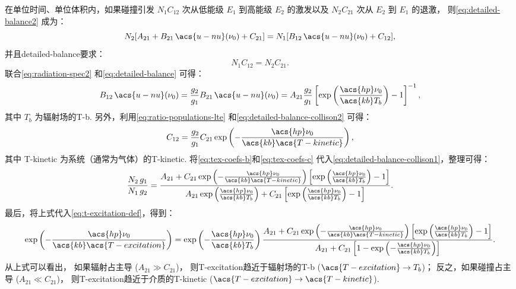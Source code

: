 在单位时间、单位体积内，如果碰撞引发 $N_1 C_{12}$ 次从低能级 $E_1$ 到高能级 $E_2$
的激发以及 $N_2 C_{21}$ 次从 $E_2$ 到 $E_1$ 的退激，
则\autoref{eq:detailed-balance2} 成为：
\begin{equation}
  \label{eq:detailed-balance-collison1}
  N_2 [A_{21} + B_{21} \,\acs{u-nu}(\nu_0) + C_{21}]
    = N_1 [B_{12} \,\acs{u-nu}(\nu_0) + C_{12}] ,
\end{equation}
并且\ac{detailed-balance}要求：
\begin{equation}
  \label{eq:detailed-balance-collison2}
  N_1 C_{12} = N_2 C_{21} .
\end{equation}
联合\autoref{eq:radiation-spec2} 和\autoref{eq:detailed-balance} 可得：
\begin{equation}
  \label{eq:tex-coefs-b}
  B_{12} \,\acs{u-nu}(\nu_0)
    = \frac{g_2}{g_1} B_{21} \,\acs{u-nu}(\nu_0)
    = A_{21} \frac{g_2}{g_1} \left[ \exp\left(
        \frac{\acs{hp} \nu_0}{\acs{kb} T_b} \right) - 1 \right]^{-1} ,
\end{equation}
其中 $T_b$ 为辐射场的\acl{T-b}.
另外，利用\autoref{eq:ratio-populations-lte}
和\autoref{eq:detailed-balance-collison2} 可得：
\begin{equation}
  \label{eq:tex-coefs-c}
  C_{12} = \frac{g_2}{g_1} C_{21}
    \exp\left( - \frac{\acs{hp} \nu_0}{\acs{kb} \acs{T-kinetic}} \right) ,
\end{equation}
其中 \acs{T-kinetic} 为系统（通常为气体）的\acl{T-kinetic}.
将\autoref{eq:tex-coefs-b}和\autoref{eq:tex-coefs-c}
代入\autoref{eq:detailed-balance-collison1}，整理可得：
\begin{equation}
  \frac{N_2\,g_1}{N_1\,g_2} =
    \frac{A_{21} + C_{21}
    \exp\left( -\frac{\acs{hp} \nu_0}{\acs{kb} \acs{T-kinetic}} \right)
      \left[ \exp\left( \frac{\acs{hp} \nu_0}{\acs{kb} T_b} \right)
        - 1 \right]
    }{A_{21} \exp\left( \frac{\acs{hp} \nu_0}{\acs{kb} T_b} \right)
     + C_{21} \left[ \exp\left( \frac{\acs{hp} \nu_0}{\acs{kb} T_b}
       \right) - 1 \right]} .
\end{equation}
最后，将上式代入\autoref{eq:t-excitation-def}，得到：
\begin{equation}
  \label{eq:t-excitation}
  \exp\left(- \frac{\acs{hp} \nu_0}{\acs{kb} \acs{T-excitation}} \right) =
    \exp\left( -\frac{\acs{hp} \nu_0}{\acs{kb} T_b} \right)
    \frac{A_{21} + C_{21} \exp\left(
      -\frac{\acs{hp} \nu_0}{\acs{kb} \acs{T-kinetic}} \right)
      \left[ \exp\left( \frac{\acs{hp} \nu_0}{\acs{kb} T_b} \right)
        - 1 \right]
    }{A_{21} + C_{21} \left[ 1 - \exp\left(
      -\frac{\acs{hp} \nu_0}{\acs{kb} T_b} \right) \right]} .
\end{equation}
从上式可以看出，
如果辐射占主导 ($A_{21} \gg C_{21}$)，
则\acl{T-excitation}趋近于辐射场的\acl{T-b} ($\acs{T-excitation} \to T_b$)；
反之，如果碰撞占主导 ($A_{21} \ll C_{21}$)，
则\acl{T-excitation}趋近于介质的\acl{T-kinetic}
($\acs{T-excitation} \to \acs{T-kinetic}$).


